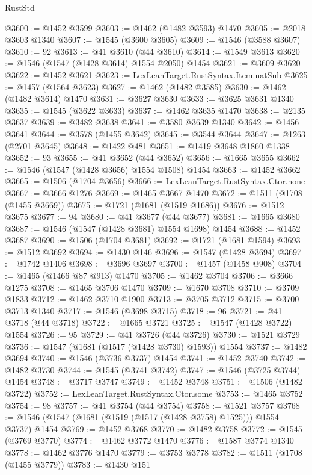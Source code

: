 \begin{lexlean}{RustStd}
\begin{coremodule}
@3600 := @1452 @3599
@3603 := @1462 (@1482 @3593) @1470
@3605 := @2018 @3603 @1340
@3607 := @1545 (@3600 @3605)
@3609 := @1546 (@3588 @3607)
@3610 := 92
@3613 := @41 @3610 (@44 @3610)
@3614 := @1549 @3613
@3620 := @1546 (@1547 (@1428 @3614) @1554 @2050) @1454
@3621 := @3609 @3620
@3622 := @1452 @3621
@3623 := LexLeanTarget.RustSyntax.Item.natSub
@3625 := @1457 (@1564 @3623)
@3627 := @1462 (@1482 @3585)
@3630 := @1462 (@1482 @3614) @1470
@3631 := @3627 @3630
@3633 := @3625 @3631 @1340
@3635 := @1545 (@3622 @3633)
@3637 := @1462 @3635 @1470
@3638 := @2135 @3637
@3639 := @3482 @3638
@3641 := @3580 @3639 @1340
@3642 := @1456 @3641
@3644 := @3578 (@1455 @3642)
@3645 := @3544 @3644
@3647 := @1263 (@2701 @3645)
@3648 := @1422 @481
@3651 := @1419 @3648 @1860 @1338
@3652 := 93
@3655 := @41 @3652 (@44 @3652)
@3656 := @1665 @3655
@3662 := @1546 (@1547 (@1428 @3656) @1554 @1508) @1454
@3663 := @1452 @3662
@3665 := @1506 (@1704 @3656)
@3666 := LexLeanTarget.RustSyntax.Ctor.none
@3667 := @3666 @1276
@3669 := @1465 @3667 @1470
@3672 := @1511 (@1708 (@1455 @3669))
@3675 := @1721 (@1681 (@1519 @1686))
@3676 := @1512 @3675
@3677 := 94
@3680 := @41 @3677 (@44 @3677)
@3681 := @1665 @3680
@3687 := @1546 (@1547 (@1428 @3681) @1554 @1698) @1454
@3688 := @1452 @3687
@3690 := @1506 (@1704 @3681)
@3692 := @1721 (@1681 @1594)
@3693 := @1512 @3692
@3694 := @1430 @146
@3696 := @1547 (@1428 @3694)
@3697 := @1742 @1406
@3698 := @3696 @3697
@3700 := @1457 (@1458 @908)
@3704 := @1465 (@1466 @87 @913) @1470
@3705 := @1462 @3704
@3706 := @3666 @1275
@3708 := @1465 @3706 @1470
@3709 := @1670 @3708
@3710 := @3709 @1833
@3712 := @1462 @3710 @1900
@3713 := @3705 @3712
@3715 := @3700 @3713 @1340
@3717 := @1546 (@3698 @3715)
@3718 := 96
@3721 := @41 @3718 (@44 @3718)
@3722 := @1665 @3721
@3725 := @1547 (@1428 @3722) @1554
@3726 := 95
@3729 := @41 @3726 (@44 @3726)
@3730 := @1521 @3729
@3736 := @1547 (@1681 (@1517 (@1428 @3730) @1593)) @1554
@3737 := @1482 @3694
@3740 := @1546 (@3736 @3737) @1454
@3741 := @1452 @3740
@3742 := @1482 @3730
@3744 := @1545 (@3741 @3742)
@3747 := @1546 (@3725 @3744) @1454
@3748 := @3717 @3747
@3749 := @1452 @3748
@3751 := @1506 (@1482 @3722)
@3752 := LexLeanTarget.RustSyntax.Ctor.some
@3753 := @1465 @3752
@3754 := 98
@3757 := @41 @3754 (@44 @3754)
@3758 := @1521 @3757
@3768 := @1546 (@1547 (@1681 (@1519 (@1517 (@1428 @3758) @1525))) @1554 @3737) @1454
@3769 := @1452 @3768
@3770 := @1482 @3758
@3772 := @1545 (@3769 @3770)
@3774 := @1462 @3772 @1470
@3776 := @1587 @3774 @1340
@3778 := @1462 @3776 @1470
@3779 := @3753 @3778
@3782 := @1511 (@1708 (@1455 @3779))
@3783 := @1430 @151

\end{coremodule}
\end{lexlean}
